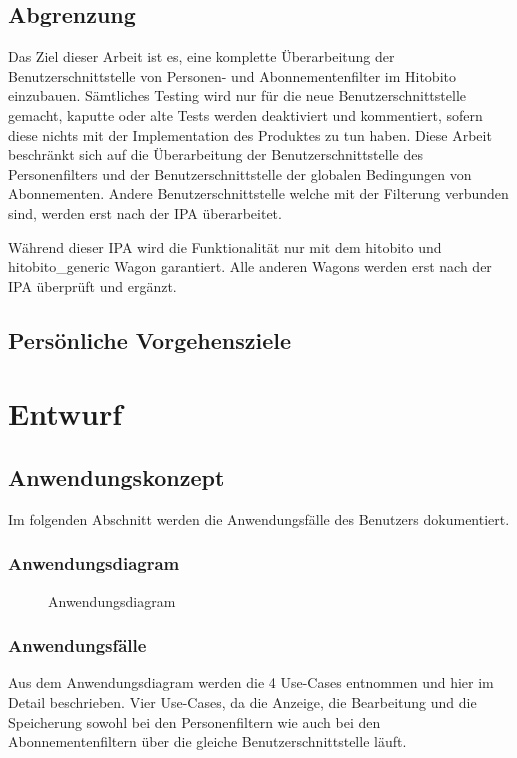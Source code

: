 \section{Abgrenzung}
Das Ziel dieser Arbeit ist es, eine komplette Überarbeitung der Benutzerschnittstelle von Personen- und Abonnementenfilter im Hitobito einzubauen.
Sämtliches Testing wird nur für die neue Benutzerschnittstelle gemacht, kaputte oder alte Tests werden deaktiviert und
kommentiert, sofern diese nichts mit der Implementation des Produktes zu tun haben. Diese Arbeit beschränkt sich auf die Überarbeitung der Benutzerschnittstelle des Personenfilters
und der Benutzerschnittstelle der globalen Bedingungen von Abonnementen. Andere Benutzerschnittstelle welche mit der Filterung verbunden sind,
werden erst nach der IPA überarbeitet.

Während dieser IPA wird die Funktionalität nur mit dem hitobito und hitobito\_generic Wagon garantiert. Alle anderen Wagons 
werden erst nach der IPA überprüft und ergänzt.

\section{Persönliche Vorgehensziele}

\chapter{Entwurf}
\section{Anwendungskonzept}
Im folgenden Abschnitt werden die Anwendungsfälle des Benutzers dokumentiert.

\subsection{Anwendungsdiagram}
\begin{figure}[h]
   \centering
   \caption{Anwendungsdiagram}
\end{figure}

\newpage

\subsection{Anwendungsfälle}
Aus dem Anwendungsdiagram werden die 4 Use-Cases entnommen und hier im Detail beschrieben. Vier Use-Cases, da die Anzeige,
die Bearbeitung und die Speicherung sowohl bei den Personenfiltern wie auch bei den Abonnementenfiltern über die gleiche Benutzerschnittstelle
läuft.

